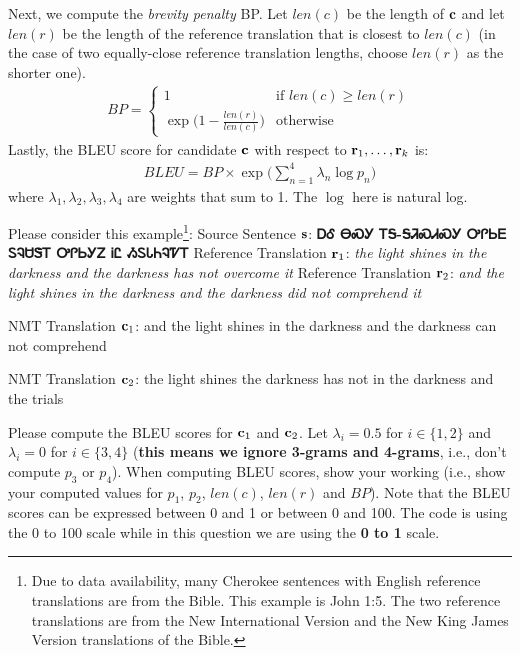 \begin{parts}
    Next, we compute the \textit{brevity penalty} BP. Let $len(c)$ be the length of $\mathbf{c}$ and let $len(r)$ be the length of the reference translation that is closest to $len(c)$ (in the case of two equally-close reference translation lengths, choose $len(r)$ as the shorter one).
    \begin{align}
        BP =
        \begin{cases}
            1 & \text{if } len(c) \ge len(r) \\
            \exp \big( 1 - \frac{len(r)}{len(c)} \big) & \text{otherwise}
        \end{cases}
    \end{align}
    Lastly, the BLEU score for candidate $\mathbf{c}$ with respect to $\mathbf{r}_1,\dots,\mathbf{r}_k$ is:
    \begin{align}
        BLEU = BP \times \exp \Big( \sum_{n=1}^4 \lambda_n \log p_n \Big)
    \end{align}
    where $\lambda_1,\lambda_2,\lambda_3,\lambda_4$ are weights that sum to 1. The $\log$ here is natural log.
    \newline
    \begin{subparts}
        \subpart[5] Please consider this example\footnote{Due to data availability, many Cherokee sentences with English reference translations are from the Bible. This example is John 1:5. The two reference translations are from the New International Version and the New King James Version translations of the Bible.}: \newline
        Source Sentence $\mathbf{s}$: \textbf{{\cherokeefam ᎠᎴ ᎾᏍᎩ ᎢᎦ-ᎦᏘᏍᏗᏍᎩ ᎤᎵᏏᎬ ᏚᎸᏌᏕᎢ ᎤᎵᏏᎩᏃ ᎥᏝ ᏱᏚᏓᏂᎸᏤᎢ}}
        \newline
        Reference Translation $\mathbf{r}_1$: \textit{the light shines in the darkness and the darkness has not overcome it}
        \newline
        Reference Translation $\mathbf{r}_2$: \textit{and the light shines in the darkness and the darkness did not comprehend it}

        NMT Translation $\mathbf{c}_1$: and the light shines in the darkness and the darkness can not comprehend

        NMT Translation $\mathbf{c}_2$: the light shines the darkness has not in the darkness and the trials

        Please compute the BLEU scores for $\mathbf{c}_1$ and $\mathbf{c}_2$. Let $\lambda_i=0.5$ for $i\in\{1,2\}$ and $\lambda_i=0$ for $i\in\{3,4\}$ (\textbf{this means we ignore 3-grams and 4-grams}, i.e., don't compute $p_3$ or $p_4$). When computing BLEU scores, show your working (i.e., show your computed values for $p_1$, $p_2$, $len(c)$, $len(r)$ and $BP$). Note that the BLEU scores can be expressed between 0 and 1 or between 0 and 100. The code is using the 0 to 100 scale while in this question we are using the \textbf{0 to 1} scale.
        \newline


\end{subparts}
\end{parts}
